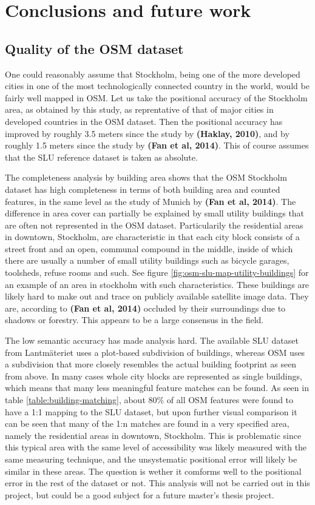 \documentclass{kththesis}
\begin{document}
\chapter{Conclusions and future work}

\section{Quality of the OSM dataset}

One could reasonably assume that Stockholm, being one of the more developed cities in one of the most technologically connected country in the world, would be fairly well mapped in OSM.
Let us take the positional accuracy of the Stockholm area, as obtained by this study, as reprentative of that of major cities in developed countries in the OSM dataset.
Then the positional accuracy has improved by roughly 3.5 meters since the study by \textbf{(Haklay, 2010)}, and by roughly 1.5 meters since the study by \textbf{(Fan et al, 2014)}.
This of course assumes that the SLU reference dataset is taken as absolute.

The completeness analysis by building area shows that the OSM Stockholm dataset has high completeness in terms of both building area and counted features, in the same level as the study of Munich by \textbf{(Fan et al, 2014)}.
The difference in area cover can partially be explained by small utility buildings that are often not represented in the OSM dataset.
Particularily the residential areas in downtown, Stockholm, are characteristic in that each city block consists of a street front and an open, communal compound in the middle, inside of which there are usually a number of small utility buildings such as bicycle garages, toolsheds, refuse rooms and such.
See figure \ref{fig:osm-slu-map-utility-buildings} for an example of an area in stockholm with such characteristics.
These buildings are likely hard to make out and trace on publicly available satellite image data.
They are, according to \textbf{(Fan et al, 2014)} occluded by their surroundings due to shadows or forestry.
This appears to be a large consensus in the field.

The low semantic accuracy has made analysis hard.
The available SLU dataset from Lantmäteriet uses a plot-based subdivision of buildings, whereas OSM uses a subdivision that more closely resembles the actual building footprint as seen from above.
In many cases whole city blocks are represented as single buildings, which means that many less meaningful feature matches can be found.
As seen in table \ref{table:building-matching}, about 80\% of all OSM features were found to have a 1:1 mapping to the SLU dataset, but upon further visual comparison it can be seen that many of the 1:n matches are found in a very specified area, namely the residential areas in downtown, Stockholm.
This is problematic since this typical area with the same level of accessibility was likely measured with the same measuring technique, and the unsystematic positional error will likely be similar in these areas.
The question is wether it comforms well to the positional error in the rest of the dataset or not.
This analysis will not be carried out in this project, but could be a good subject for a future master's thesis project.
\end{document}
